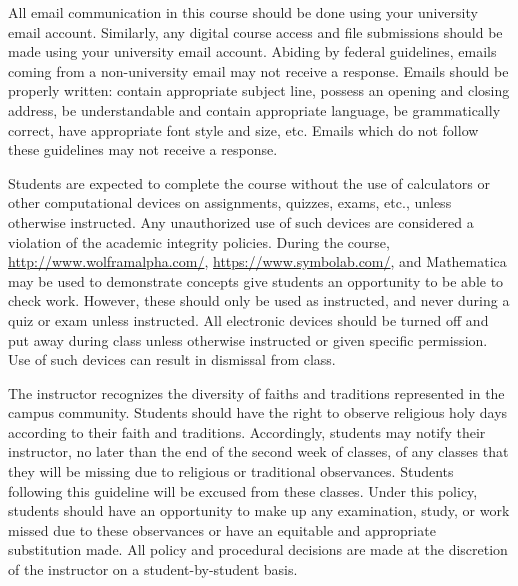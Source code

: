 \documentclass[11pt,letterpaper]{article}
\begin{document}

All email communication in this course should be done using your university email account. Similarly, any digital course access and file submissions should be made using your university email account. Abiding by federal guidelines, emails coming from a non-university email may not receive a response. Emails should be properly written: contain appropriate subject line, possess an opening and closing address, be understandable and contain appropriate language, be grammatically correct, have appropriate font style and size, etc. Emails which do not follow these guidelines may not receive a response. 
\sectionbreak




Students are expected to complete the course without the use of calculators or other computational devices on assignments, quizzes, exams, etc., unless otherwise instructed. Any unauthorized use of such devices are considered a violation of the academic integrity policies. During the course, \href{http://www.wolframalpha.com/}{http://www.wolframalpha.com/}, \href{https://www.symbolab.com/}{https://www.symbolab.com/}, and Mathematica may be used to demonstrate concepts give students an opportunity to be able to check work. However, these should only be used as instructed, and never during a quiz or exam unless instructed. All electronic devices should be turned off and put away during class unless otherwise instructed or given specific permission. Use of such devices can result in dismissal from class.
\sectionbreak




The instructor recognizes the diversity of faiths and traditions represented in the campus community. Students should have the right to observe religious holy days according to their faith and traditions. Accordingly, students may notify their instructor, no later than the end of the second week of classes, of any classes that they will be missing due to religious or traditional observances. Students following this guideline will be excused from these classes. Under this policy, students should have an opportunity to make up any examination, study, or work missed due to these observances or have an equitable and appropriate substitution made. All policy and procedural decisions are made at the discretion of the instructor on a student-by-student basis. 
\sectionbreak
\end{document}
